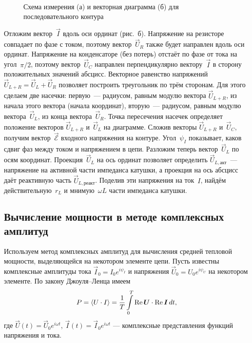 \begin{figure}[h]
	\begin{minipage}[h]{0.49\linewidth}
		\centering\small
	\end{minipage}
	\hfill
	\begin{minipage}[h]{0.49\linewidth}
		\centering\small
	\end{minipage}
	\caption{Схема измерения (а) и векторная  диаграмма (б) для
последовательного контура}
\end{figure}

Отложим вектор~$\vec I$ вдоль оси ординат (рис.~б). Напряжение на
резисторе совпадает по фазе с током, поэтому вектор~$\vec U_R$ также будет
направлен вдоль оси ординат. Напряжение на конденсаторе (без потерь) отстаёт по
фазе от тока на угол~$\pi/2$, поэтому вектор~$\vec{U}_{\! C}$ направлен
перпендикулярно вектору~$\vec I$ в сторону положительных значений абсцисс.
Векторное равенство напряжений $\vec U_{L+R}=\vec U_L+\vec U_R$ позволяет
построить треугольник по трём сторонам. Для этого сделаем две насечки:
первую~--- радиусом, равным модулю вектора $\vec U_{L+R}$, из начала этого
вектора (начала координат), вторую~--- радиусом, равным модулю вектора~$\vec
U_L$, из конца вектора~$\vec U_R$. Точка пересечения насечек определяет
положение векторов $\vec U_{L+R}$ и~$\vec U_L$ на диаграмме. Сложив векторы
$\vec{U}_{L+R}$ и~$\vec{U}_{\! C}$, получим вектор~$\vec{\mathcal{E}}$ входного
напряжения на контуре. Угол~$\psi_I$ показывает, каков сдвиг фаз между током и
напряжением в цепи. Разложим теперь вектор~$\vec U_L$ по осям координат.
Проекция~$\vec U_L$ на ось ординат позволяет определить $\vec
U_{L,\text{акт}}$~--- напряжение на активной части импеданса катушки, а проекция
на ось абсцисс даёт реактивную часть $\vec U_{L,\text{реакт}}$. Поделив эти
напряжения на ток~$I$, найдём действительную~$r_L$ и мнимую~$\omega L$ части
импеданса катушки.

\subsection{Вычисление мощности в методе комплексных амплитуд}
Используем метод комплексных амплитуд для вычисления 
средней тепловой мощности, выделяющейся на некотором элементе цепи.
Пусть известны комплексные амплитуды тока $\vec{I}_0=I_0 e^{i\psi_I}$ и напряжения
$\vec{U}_0 = U_0  e^{i\psi_U}$ на некотором элементе. 
По закону Джоуля--Ленца имеем
\begin{equation}
\eqmark{JoulLentz}
P = \left< U\cdot I \right> = \frac1{T} \int\limits_0^T \Re \vec{U} \cdot \Re \vec{I}\, dt,
\end{equation}
где $\vec{U}(t) = \vec{U}_0 e^{i\omega t}$, 
$\vec{I}(t) = \vec{I}_0 e^{i\omega t}$ --- комплексные представления 
функций напряжения и тока.

